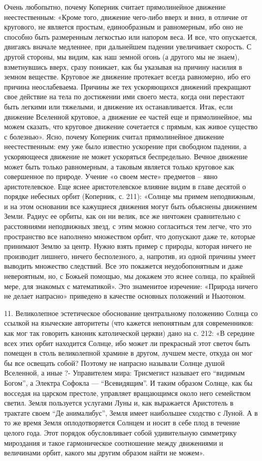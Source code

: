 Очень любопытно, почему Коперник считает прямолинейное движение
неестественным: «Кроме того, движение чего-либо вверх и вниз, в
отличие от кругового, не является простым, единообразным и
равномерным, ибо оно не способно быть размеренным легкостью или
напором веса. И все, что опускается, двигаясь вначале медленнее, при
дальнейшем падении увеличивает скорость. С другой стороны, мы видим,
как наш земной огонь (а другого мы не знаем), взметнувшись вверх,
сразу поникает, как бы указывая на причину насилия в земном веществе.
Круговое же движение протекает всегда равномерно, ибо его причина
неослабеваема. Причины же тех ускоряющихся движений прекращают свое
действие на тела по достижении ими своего места, когда они перестают
быть легкими или тяжелыми, и движение их останавливается. Итак, если
движение Вселенной круговое, а движение ее частей еще и прямолинейное,
мы можем сказать, что круговое движение сочетается с прямым, как живое
существо с болезнью». Ясно, почему Коперник считал прямолинейное
движение неестественным: ему уже было известно ускорение при свободном
падении, а ускоряющееся движение не может ускоряться беспредельно.
Вечное движение может быть только равномерным, а таковым является
только круговое как совершенное по природе. Учение «о своем месте»
предметов -- явно аристотелевское. Еще яснее аристотелевское влияние
видим в главе десятой о порядке небесных орбит (Коперник, с. 211):
«Солнце мы примем неподвижным, и на этом основании все кажущиеся
движения могут быть объяснены движением Земли. Радиус ее орбиты, как
он ни велик, все же ничтожен сравнительно с расстояниями неподвижных
звезд, с этим можно согласиться тем легче, что это пространство все
наполнено множеством орбит, что допускают даже те, которые принимают
Землю за центр. Нужно взять пример с природы, которая ничего не
производит лишнего, ничего бесполезного, а, напротив, из одной причины
умеет выводить множество следствий. Все это покажется неудобопонятным
и даже невероятным, но, с Божьей помощью, мы докажем это яснее солнца,
по крайней мере, для знакомых с математикой». Это знаменитое
изречение: «Природа ничего не делает напрасно» приведено в качестве
основных положений и Ньютоном.

11. Великолепное эстетическое обоснование центральному положению
Солнца со ссылкой на языческие авторитеты (что кажется непонятным для
современников: как мог так говорить каноник католической церкви) дано
на с. 212: «В середине всех этих орбит находится Солнце, ибо может ли
прекрасный этот светоч быть помещен в столь великолепной храмине в
другом, лучшем месте, откуда он мог бы все освещать собой? Поэтому не
напрасно называли Солнце душой Вселенной, а иные ?- Управителем мира:
Трисмегист называет его ``видимым Богом'', а Электра Софокла ---
``Всевидящим''. И таким образом Солнце, как бы восседая на царском
престоле, управляет вращающимся около него семейством светил. Земля
пользуется услугами Луны и, как выражается Аристотель в трактате своем
``Де анималибус'', Земля имеет наибольшее сходство с Луной. А в то же
время Земля оплодотворяется Солнцем и носит в себе плод в течение
целого года. Этот порядок обусловливает собой удивительную симметрику
мироздания и такое гармоническое соотношение между движениями и
величинами орбит, какого мы другим образом найти не можем».

